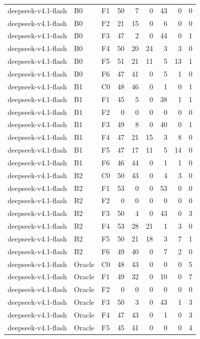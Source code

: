 \begin{tabular}{lllrrrrrr}
deepseek-v4.1-flash & B0 & F1 & 50 & 7 & 0 & 43 & 0 & 0 \\
deepseek-v4.1-flash & B0 & F2 & 21 & 15 & 0 & 6 & 0 & 0 \\
deepseek-v4.1-flash & B0 & F3 & 47 & 2 & 0 & 44 & 0 & 1 \\
deepseek-v4.1-flash & B0 & F4 & 50 & 20 & 24 & 3 & 3 & 0 \\
deepseek-v4.1-flash & B0 & F5 & 51 & 21 & 11 & 5 & 13 & 1 \\
deepseek-v4.1-flash & B0 & F6 & 47 & 41 & 0 & 5 & 1 & 0 \\
deepseek-v4.1-flash & B1 & C0 & 48 & 46 & 0 & 1 & 0 & 1 \\
deepseek-v4.1-flash & B1 & F1 & 45 & 5 & 0 & 38 & 1 & 1 \\
deepseek-v4.1-flash & B1 & F2 & 0 & 0 & 0 & 0 & 0 & 0 \\
deepseek-v4.1-flash & B1 & F3 & 49 & 8 & 0 & 40 & 0 & 1 \\
deepseek-v4.1-flash & B1 & F4 & 47 & 21 & 15 & 3 & 8 & 0 \\
deepseek-v4.1-flash & B1 & F5 & 47 & 17 & 11 & 5 & 14 & 0 \\
deepseek-v4.1-flash & B1 & F6 & 46 & 44 & 0 & 1 & 1 & 0 \\
deepseek-v4.1-flash & B2 & C0 & 50 & 43 & 0 & 4 & 3 & 0 \\
deepseek-v4.1-flash & B2 & F1 & 53 & 0 & 0 & 53 & 0 & 0 \\
deepseek-v4.1-flash & B2 & F2 & 0 & 0 & 0 & 0 & 0 & 0 \\
deepseek-v4.1-flash & B2 & F3 & 50 & 4 & 0 & 43 & 0 & 3 \\
deepseek-v4.1-flash & B2 & F4 & 53 & 28 & 21 & 1 & 3 & 0 \\
deepseek-v4.1-flash & B2 & F5 & 50 & 21 & 18 & 3 & 7 & 1 \\
deepseek-v4.1-flash & B2 & F6 & 49 & 40 & 0 & 7 & 2 & 0 \\
deepseek-v4.1-flash & Oracle & C0 & 48 & 43 & 0 & 0 & 0 & 5 \\
deepseek-v4.1-flash & Oracle & F1 & 49 & 32 & 0 & 10 & 0 & 7 \\
deepseek-v4.1-flash & Oracle & F2 & 0 & 0 & 0 & 0 & 0 & 0 \\
deepseek-v4.1-flash & Oracle & F3 & 50 & 3 & 0 & 43 & 1 & 3 \\
deepseek-v4.1-flash & Oracle & F4 & 47 & 43 & 0 & 1 & 0 & 3 \\
deepseek-v4.1-flash & Oracle & F5 & 45 & 41 & 0 & 0 & 0 & 4 \\

\end{tabular}
